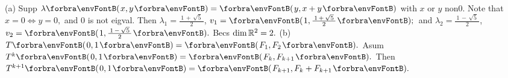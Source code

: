 (a) {\FontSmall Supp $\lambda\Par{x,y}=\Par{y,x+y}$ with $x$ or $y$ non0. Note that $x=0\Longleftrightarrow y=0,$ and $0$ is not eigval.}\vspace{1pt}\parSol{\Ha}
{\FontSmall Then $\lambda_1={}${\large$\frac{\:1\,+\,\sqrt{5}\:}{2}$}, $v_1=\Par{1,\frac{\:1\,+\,\sqrt{5}\:}{2}};$
\,and $\lambda_2={}${\large$\frac{\:1\,-\,\sqrt{5}\:}{2}$}, $v_2=\Par{1,\frac{\:1\,-\,\sqrt{5}\:}{2}}.$ Becs $\dim{\mathbb{R}}^2=2.$}\vspace{2pt}\parSol{}
(b) {\FontSmall $T\Par{0,1}=\Par{F_1,F_2}.$ Asum $T^k\Par{0,1}=\Par{F_k,F_{k+1}}.$ Then $T^{k+1}\Par{0,1}=\Par{F_{k+1},F_{k}+F_{k+1}}.$}\vspace{-6pt}\parSol{\Hb}
